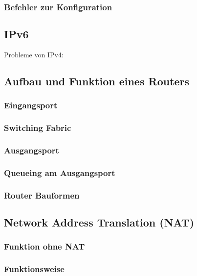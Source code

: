 \subsubsection*{Befehler zur Konfiguration}
\subsection{IPv6}
Probleme von IPv4:

\subsection{Aufbau und Funktion eines Routers}
\subsubsection{Eingangsport}
\subsubsection{Switching Fabric}
\subsubsection{Ausgangsport}
\subsubsection{Queueing am Ausgangsport}
\subsubsection{Router Bauformen}

\subsection{Network Address Translation (NAT)}
\subsubsection*{Funktion ohne NAT}
\subsubsection{Funktionsweise}
